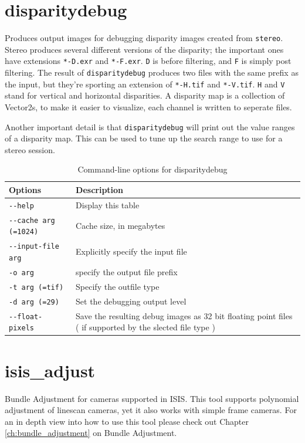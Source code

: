 \section{disparitydebug}
\label{disparitydebug}

Produces output images for debugging disparity images created from
\verb#stereo#. Stereo produces several different versions of the
disparity; the important ones have extensions \verb#*-D.exr# and
\verb#*-F.exr#. {\tt D} is before filtering, and {\tt F} is simply
post filtering. The result of \verb#disparitydebug# produces two files
with the same prefix as the input, but they're sporting an extension
of \verb#*-H.tif# and \verb#*-V.tif#. {\tt H} and {\tt V} stand for
vertical and horizontal disparities. A disparity map is a collection
of Vector2s, to make it easier to visualize, each channel is written
to seperate files.

Another important detail is that {\tt disparitydebug} will print out
the value ranges of a disparity map. This can be used to tune up the
search range to use for a stereo session.

\begin{longtable}{|l|p{10cm}|}
\caption{Command-line options for disparitydebug}
\label{tbl:disparitydebug}
\endfirsthead
\endhead
\endfoot
\endlastfoot
\hline
Options & Description \\ \hline \hline
\verb#--help# & Display this table \\ \hline
\verb#--cache arg (=1024)# & Cache size, in megabytes \\ \hline
\verb#--input-file arg# & Explicitly specify the input file \\ \hline
\verb#-o arg# & specify the output file prefix \\ \hline
\verb#-t arg (=tif)# & Specify the outfile type \\ \hline
\verb#-d arg (=29)# & Set the debugging output level \\ \hline
\verb#--float-pixels# & Save the resulting debug images as 32 bit floating point files ( if supported by the slected file type ) \\ \hline
\end{longtable}

\section{isis\_adjust}

Bundle Adjustment for cameras supported in ISIS. This tool supports
polynomial adjustment of linescan cameras, yet it also works with
simple frame cameras. For an in depth view into how to use this tool
please check out Chapter \ref{ch:bundle_adjustment} on Bundle Adjustment.

